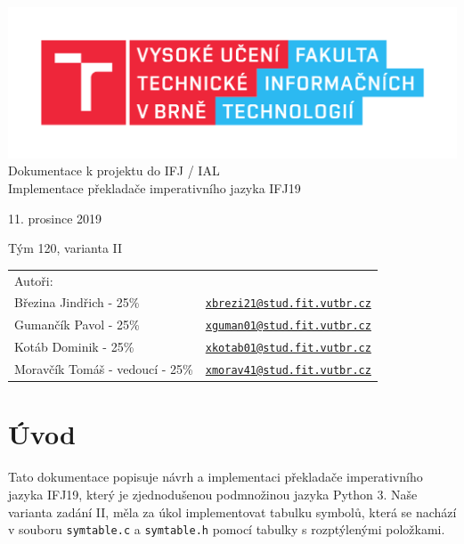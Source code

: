\documentclass[a4paper, 11pt]{article}
\begin{document}
\begin{titlepage}
\begin{center}
\includegraphics[width=0.77\linewidth]{src/FIT_logo.pdf} \\

{\Huge Dokumentace k projektu do IFJ / IAL \\ \huge Implementace překladače imperativního jazyka IFJ19}

{\huge 11. prosince 2019\\

\Huge Tým 120, varianta II}


\Large
\centering
\begin{tabular}{ll}
Autoři: & \\
Březina Jindřich - 25\% & \href{mailto:xbrezi21@stud.fit.vutbr.cz}{\texttt{xbrezi21@stud.fit.vutbr.cz}} \\
Gumančík Pavol - 25\%  & \href{mailto:xguman01@stud.fit.vutbr.cz}{\texttt{xguman01@stud.fit.vutbr.cz}} \\
Kotáb Dominik - 25\%   & \href{mailto:xkotab01@stud.fit.vutbr.cz}{\texttt{xkotab01@stud.fit.vutbr.cz}} \\
Moravčík Tomáš - vedoucí - 25\%  & \href{mailto:xmorav41@stud.fit.vutbr.cz}{\texttt{xmorav41@stud.fit.vutbr.cz}}
\end{tabular}

\end{center}
\end{titlepage}

\tableofcontents
\newpage

\section{Úvod}
Tato dokumentace popisuje návrh a implementaci překladače imperativního jazyka IFJ19, který je zjednodušenou podmnožinou jazyka Python 3. Naše varianta zadání II, měla za úkol implementovat tabulku symbolů, která se nachází v souboru \verb|symtable.c| a \verb|symtable.h| pomocí tabulky s rozptýlenými položkami.
\end{document}
